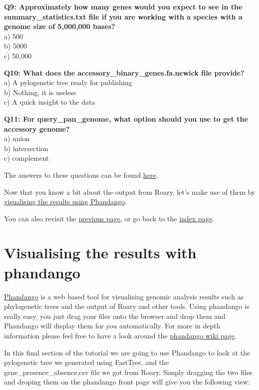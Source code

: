 \documentclass[11pt]{article}
\begin{document}
\textbf{Q9: Approximately how many genes would you expect to see in the
summary\_statistics.txt file if you are working with a species with a
genome size of 5,000,000 bases?}\\
a) 500\\
b) 5000\\
c) 50,000

\textbf{Q10: What does the accessory\_binary\_genes.fa.newick file
provide?}\\
a) A pylogenetic tree ready for publishing\\
b) Nothing, it is useless\\
c) A quick insight to the data

\textbf{Q11: For query\_pan\_genome, what option should you use to get
the accessory genome?}\\
a) union\\
b) intersection\\
c) complement

The answers to these questions can be found \href{answers.ipynb}{here}.

Now that you know a bit about the output from Roary, let's make use of
them by \href{phandango.ipynb}{visualising the results using Phandango}.

You can also revisit the \href{run_roary.ipynb}{previous page}, or go
back to the \href{index.ipynb}{index page}.





\newpage






    \hypertarget{visualising-the-results-with-phandango}{%
\section{Visualising the results with
phandango}\label{visualising-the-results-with-phandango}}

\href{http://phandango.net/}{Phandango} is a web based tool for
visualising genomic analysis results such as phylogenetic trees and the
output of Roary and other tools. Using phandango is really easy, you
just drag your files onto the browser and drop them and Phandango will
display them for you automatically. For more in depth information please
feel free to have a look around the
\href{https://github.com/jameshadfield/phandango/wiki}{phandango wiki
page}.

In this final section of the tutorial we are going to use Phandango to
look at the pylogenetic tree we generated using FastTree, and the
gene\_presence\_absence.csv file we got from Roary. Simply dragging the
two files and droping them on the phandango front page will give you the
following view:
\end{document}
